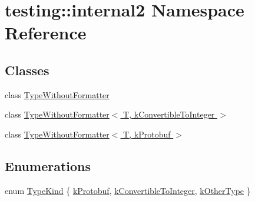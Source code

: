 \hypertarget{namespacetesting_1_1internal2}{}\section{testing\+:\+:internal2 Namespace Reference}
\label{namespacetesting_1_1internal2}
\subsection*{Classes}
\begin{DoxyCompactItemize}
\item 
class \hyperlink{classtesting_1_1internal2_1_1TypeWithoutFormatter}{Type\+Without\+Formatter}
\item 
class \hyperlink{classtesting_1_1internal2_1_1TypeWithoutFormatter_3_01T_00_01kConvertibleToInteger_01_4}{Type\+Without\+Formatter$<$ T, k\+Convertible\+To\+Integer $>$}
\item 
class \hyperlink{classtesting_1_1internal2_1_1TypeWithoutFormatter_3_01T_00_01kProtobuf_01_4}{Type\+Without\+Formatter$<$ T, k\+Protobuf $>$}
\end{DoxyCompactItemize}
\subsection*{Enumerations}
\begin{DoxyCompactItemize}
\item 
enum \hyperlink{namespacetesting_1_1internal2_aeb8161b0b3ee503347b0662d7028fd57}{Type\+Kind} \{ \hyperlink{namespacetesting_1_1internal2_aeb8161b0b3ee503347b0662d7028fd57a14aaf98a2547ecf43eef0868d54b1383}{k\+Protobuf}, 
\hyperlink{namespacetesting_1_1internal2_aeb8161b0b3ee503347b0662d7028fd57a9bdcf3f1548f498b2b7f097306ea0224}{k\+Convertible\+To\+Integer}, 
\hyperlink{namespacetesting_1_1internal2_aeb8161b0b3ee503347b0662d7028fd57abe8aaea44751d6ebd0cdf5bd94451db1}{k\+Other\+Type}
 \}
\end{DoxyCompactItemize}
